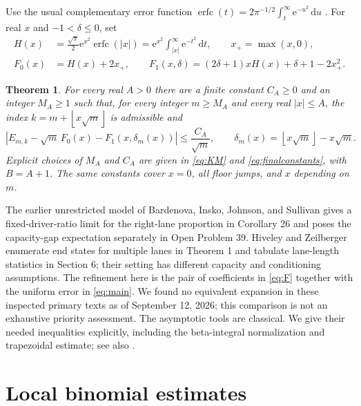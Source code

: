 \documentclass[11pt]{amsart}
\newtheorem{theorem}{Theorem}
\newcommand{\erfc}{\operatorname{erfc}}
\newcommand{\ee}{\mathrm e}
\newcommand{\dd}{\,\mathrm d}
\begin{document}
Use the usual complementary error function
$\erfc(t)=2\pi^{-1/2}\int_t^\infty\ee^{-u^2}\dd u$
\cite[Eq.~7.2.2]{DLMF}. For real $x$ and $-1<\delta\le0$, set
\begin{align}
 H(x)&=\frac{\sqrt\pi}{2}\ee^{x^2}\erfc(|x|)
      =\ee^{x^2}\int_{|x|}^{\infty}\ee^{-t^2}\dd t,
       \qquad x_+=\max(x,0),\label{eq:H}\\
 F_0(x)&=H(x)+2x_+,\qquad
 F_1(x,\delta)=(2\delta+1)xH(x)+\delta+1-2x_+^2.\label{eq:F}
\end{align}

\begin{theorem}\label{thm:main}
For every real $A>0$ there are a finite constant $C_A\ge0$ and an
integer $M_A\ge1$ such that, for every integer $m\ge M_A$ and every
real $|x|\le A$, the index $k=m+\left\lfloor x\sqrt m\right\rfloor$ is admissible and
\begin{equation}\label{eq:main}
 \left|E_{m,k}-\sqrt m\,F_0(x)-F_1(x,\delta_m(x))\right|
 \le \frac{C_A}{\sqrt m},\qquad
 \delta_m(x)=\left\lfloor x\sqrt m\right\rfloor-x\sqrt m.
\end{equation}
Explicit choices of $M_A$ and $C_A$ are given in
\eqref{eq:KM} and \eqref{eq:finalconstants}, with $B=A+1$.
The same constants cover $x=0$, all floor jumps, and $x$ depending on $m$.
\end{theorem}

The earlier unrestricted model of Bardenova, Insko, Johnson, and
Sullivan \cite{BIJS2023} gives a fixed-driver-ratio limit for the
right-lane proportion in Corollary 26 and poses the capacity-gap
expectation separately in Open Problem 39.
Hiveley and Zeilberger \cite{HZ2026} enumerate end states for multiple
lanes in Theorem 1 and tabulate lane-length statistics in Section 6;
their setting has different capacity and conditioning assumptions.
The refinement here is the pair of coefficients in \eqref{eq:F}
together with the uniform error in \eqref{eq:main}.
We found no equivalent expansion in these inspected primary texts
as of September 12, 2026; this comparison is not an exhaustive priority
assessment. The asymptotic tools are classical. We give their needed
inequalities explicitly, including the beta-integral normalization
and trapezoidal estimate; see also \cite[Sections 5.12 and 3.5(i)]{DLMF}.

\section{Local binomial estimates}
\end{document}
